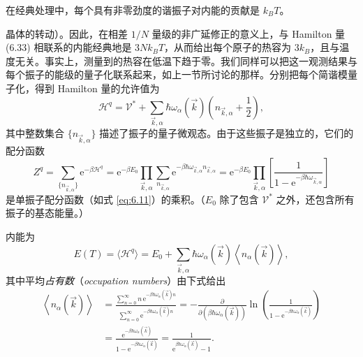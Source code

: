在经典处理中，每个具有非零劲度的谐振子对内能的贡献是 $k_BT$。


晶体的转动）。因此，在相差 $1/N$ 量级的非广延修正的意义上，与 Hamilton 量 (6.33) 相联系的内能经典地是 $3Nk_BT$，从而给出每个原子的热容为 $3k_B$，且与温度无关。事实上，测量到的热容在低温下趋于零。我们同样可以把这一观测结果与每个振子的能级的量子化联系起来，如上一节所讨论的那样。分别把每个简谐模量子化，得到 Hamilton 量的允许值为
\begin{equation}\label{eq:6.34}
\mathscr H^q=\mathcal V^*+\sum_{\vec k,\alpha}\hbar\omega_\alpha(\vec k)\left(n_{\vec k,\alpha}+\frac12\right),
\end{equation}
其中整数集合 $\{n_{\vec k,\alpha}\}$ 描述了振子的量子微观态。由于这些振子是独立的，它们的配分函数
\begin{equation}\label{eq:6.35}
Z^q=\sum_{\{n_{\vec k,\alpha}\}}\mathrm e^{-\beta\mathscr H^q}=\mathrm e^{-\beta E_0}\prod_{\vec k,\alpha}\sum_{n_{\vec k,\alpha}}\mathrm e^{-\beta\hbar\omega_{\vec k,\alpha}n_{\vec k,\alpha}}=\mathrm e^{-\beta E_0}\prod_{\vec k,\alpha}\left[\frac1{1-\mathrm e^{-\beta\hbar\omega_{\vec k,\alpha}}}\right]
\end{equation}
是单振子配分函数（如式 \eqref{eq:6.11}）的乘积。（$E_0$ 除了包含 $\mathcal V^*$ 之外，还包含所有振子的基态能量。）

内能为
\begin{equation}\label{eq:6.36}
E(T)=\langle\mathscr H^q\rangle=E_0+\sum_{\vec k,\alpha}\hbar\omega_\alpha(\vec k)\left\langle n_\alpha(\vec k)\right\rangle,
\end{equation}
其中平均\emph{占有数}（\textit{occupation numbers}）由下式给出
\begin{equation}\label{eq:6.37}
\begin{aligned}
\left\langle n_\alpha(\vec k)\right\rangle&=\frac{\sum_{n=0}^\infty n\,\mathrm e^{-\beta\hbar\omega_\alpha(\vec k)n}}{\sum_{n=0}^\infty\mathrm e^{-\beta\hbar\omega_\alpha(\vec k)n}}=-\frac{\partial}{\partial(\beta\hbar\omega_\alpha(\vec k))}\ln\left(\frac1{1-\mathrm e^{-\beta\hbar\omega_\alpha(\vec k)}}\right)\\
&=\frac{\mathrm e^{-\beta\hbar\omega_\alpha(\vec k)}}{1-\mathrm e^{-\beta\hbar\omega_\alpha(\vec k)}}=\frac1{\mathrm e^{\beta\hbar\omega_\alpha(\vec k)}-1}.
\end{aligned}
\end{equation}

